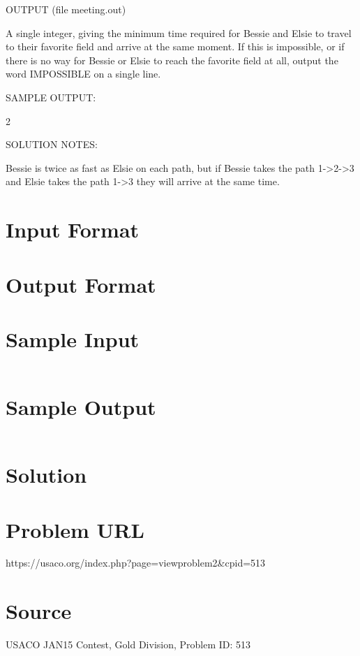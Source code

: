 \documentclass[12pt]{article}
\begin{document}
OUTPUT (file meeting.out)

A single integer, giving the minimum time required for Bessie and
Elsie to travel to their favorite field and arrive at the same moment.
If this is impossible, or if there is no way for Bessie or Elsie to reach
the favorite field at all, output the word IMPOSSIBLE on a single line.

SAMPLE OUTPUT:

2

SOLUTION NOTES:

Bessie is twice as fast as Elsie on each path, but if Bessie takes the
path 1->2->3 and Elsie takes the path 1->3 they will arrive at the
same time.




\section*{Input Format}


\section*{Output Format}


\section*{Sample Input}
\begin{verbatim}

\end{verbatim}

\section*{Sample Output}
\begin{verbatim}

\end{verbatim}

\section*{Solution}


\section*{Problem URL}
https://usaco.org/index.php?page=viewproblem2&cpid=513

\section*{Source}
USACO JAN15 Contest, Gold Division, Problem ID: 513
\end{document}
